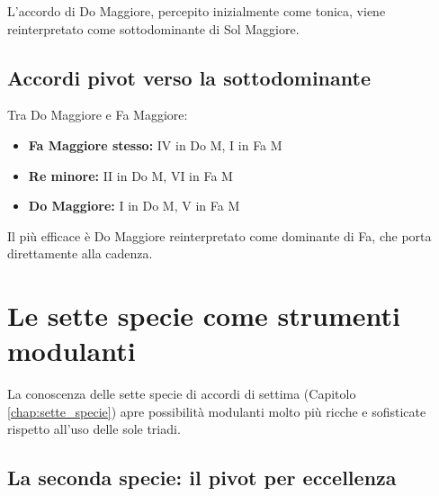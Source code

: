 \begin{esempio}[Modulazione Do Maggiore $\rightarrow$ Sol Maggiore tramite pivot I = IV]
	\label{ex:mod_do_sol}

	L'accordo di Do Maggiore, percepito inizialmente come tonica, viene reinterpretato come sottodominante di Sol Maggiore.
\end{esempio}

\subsection{Accordi pivot verso la sottodominante}
\label{subsec:pivot_sottodominante}

\begin{regola}
	\label{reg:pivot_sottodominante}
	Tra Do Maggiore e Fa Maggiore:
	
	\begin{itemize}
		\item \textbf{Fa Maggiore stesso:} IV in Do M, I in Fa M
		\item \textbf{Re minore:} II in Do M, VI in Fa M
		\item \textbf{Do Maggiore:} I in Do M, V in Fa M
	\end{itemize}
	
	Il più efficace è Do Maggiore reinterpretato come dominante di Fa, che porta direttamente alla cadenza.
\end{regola}

\begin{esempio}[Modulazione Do Maggiore $\rightarrow$ Fa Maggiore tramite pivot I = V]
	\label{ex:mod_do_fa}
	
\end{esempio}

\section{Le sette specie come strumenti modulanti}
\label{sec:specie_modulazione}

La conoscenza delle sette specie di accordi di settima (Capitolo \ref{chap:sette_specie}) apre possibilità modulanti molto più ricche e sofisticate rispetto all'uso delle sole triadi.

\subsection{La seconda specie: il pivot per eccellenza}
\label{subsec:seconda_specie_pivot}

